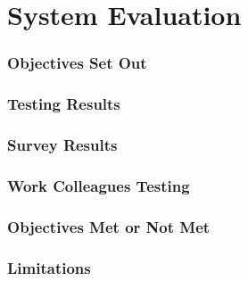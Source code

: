 \chapter{System Evaluation}

\subsection{Objectives Set Out}

\subsection{Testing Results}

\subsection{Survey Results}

\subsection{Work Colleagues Testing}

\subsection{Objectives Met or Not Met}

\subsection{Limitations}